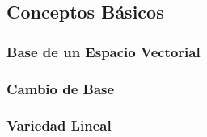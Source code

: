 \subsection{Conceptos Básicos}
\subsubsection{Base de un Espacio Vectorial}
\subsubsection{Cambio de Base}
\subsubsection{Variedad Lineal}